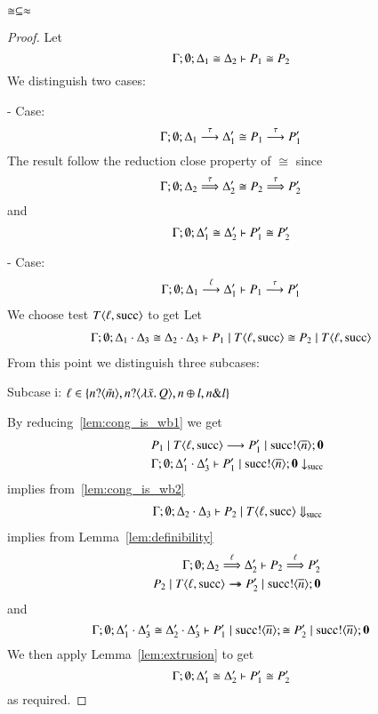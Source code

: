 \begin{lemma}\rm
	\label{lem:cong_is_wb}
	$\cong \subseteq \approx$
\end{lemma}

\begin{proof}
	\noi Let
	\[
		\Gamma; \emptyset; \Delta_1 \cong \Delta_2 \vdash P_1 \cong P_2
	\]
	\noi We distinguish two cases:

	\noi - Case:
	\[
		\Gamma; \emptyset; \Delta_1 \stackrel{\tau}{\longrightarrow} \Delta_1' \cong P_1 \stackrel{\tau}{\longrightarrow} P_1' 
	\]
	\noi The result follow the reduction close property of $\cong$ since
	\[
		\Gamma; \emptyset; \Delta_2 \stackrel{\tau}{\Longrightarrow} \Delta_2' \cong P_2 \stackrel{\tau}{\Longrightarrow} P_2' 
	\]
	\noi and
	\[
		\Gamma; \emptyset; \Delta_1' \cong \Delta_2' \vdash P_1' \cong P_2'
	\]

	\noi - Case:
	\begin{eqnarray}
		\Gamma; \emptyset; \Delta_1 \stackrel{\ell}{\longrightarrow} \Delta_1' \vdash P_1 \stackrel{\tau}{\longrightarrow} P_1'
		\label{lem:cong_is_wb1}
	\end{eqnarray}
	We choose test $T\langle \ell, \textrm{succ} \rangle$ to get
	\noi Let
	\begin{eqnarray}
		\Gamma; \emptyset; \Delta_1 \cdot \Delta_3 \cong \Delta_2 \cdot \Delta_3 \vdash P_1 \;|\; T\langle \ell, \textrm{succ} \rangle \cong P_2 \;|\; T\langle \ell, \textrm{succ} \rangle
		\label{lem:cong_is_wb2}
	\end{eqnarray}
%
	\noi From this point we distinguish three subcases:

	\noi Subcase i: $\ell \in \{n ? \langle \tilde{m} \rangle, n ? \langle \lambda \tilde{x}.\,Q \rangle, n \oplus l, n \& l\}$

	\noi By reducing~\ref{lem:cong_is_wb1} we get
	\begin{eqnarray*}
		&&P_1 \;|\; T\langle \ell, \textrm{succ} \rangle \longrightarrow P_1' \;|\; \textrm{succ} ! \langle \overline{n} \rangle ; \mathbf{0} \\
		&&\Gamma; \emptyset; \Delta_1' \cdot \Delta_3' \vdash P_1' \;|\; \textrm{succ} ! \langle \overline{n} \rangle ; \mathbf{0} \downarrow_{\textrm{succ}}
	\end{eqnarray*}
	\noi implies from~\ref{lem:cong_is_wb2}
	\begin{eqnarray*}
		&&\Gamma; \emptyset; \Delta_2 \cdot \Delta_3 \vdash P_2 \;|\; T\langle \ell, \textrm{succ} \rangle \Downarrow_{\textrm{succ}}
	\end{eqnarray*}
	\noi implies from Lemma~\ref{lem:definibility}
	\begin{eqnarray*}
		&&\Gamma; \emptyset; \Delta_2 \stackrel{\ell}{\Longrightarrow} \Delta_2' \vdash P_2 \stackrel{\ell}{\Longrightarrow} P_2'\\
		&&P_2 \;|\; T \langle \ell, \textrm{succ} \rangle \rightarrow\!\!\!\!\!\rightarrow P_2' \;|\; \textrm{succ} ! \langle \overline{n} \rangle ; \mathbf{0}
	\end{eqnarray*}
	\noi and
	\[
		\Gamma; \emptyset; \Delta_1' \cdot \Delta_3' \cong \Delta_2' \cdot \Delta_3' \vdash P_1' \;|\; \textrm{succ} ! \langle \overline{n} \rangle ; \cong P_2' \;|\; \textrm{succ} ! \langle \overline{n} \rangle ; \mathbf{0}
	\]
	We then apply Lemma~\ref{lem:extrusion} to get
	\[
		\Gamma; \emptyset; \Delta_1' \cong \Delta_2' \vdash P_1' \cong P_2'
	\]
	\noi as required.


\end{proof}
